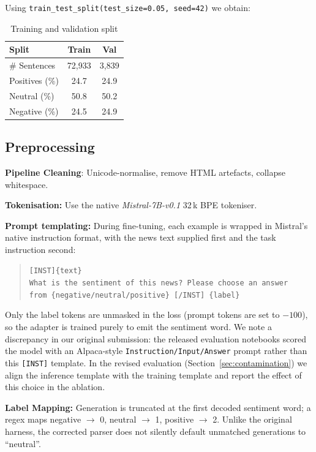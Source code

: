 \documentclass[a4paper]{article}
\begin{document}
Using \texttt{train\_test\_split(test\_size=0.05, seed=42)} we obtain:

\begin{table}[htbp]
\centering
\caption{Training and validation split}
\label{tab:train-test-split}
\begin{tabular}{lcc}
\toprule
\textbf{Split} & \textbf{Train} & \textbf{Val} \\
\midrule
\# Sentences     & 72,933 & 3,839 \\
Positives (\%)   & 24.7   & 24.9  \\
Neutral (\%)     & 50.8   & 50.2  \\
Negative (\%)    & 24.5   & 24.9  \\
\bottomrule
\end{tabular}
\end{table}

\subsection{Preprocessing}

\textbf{Pipeline Cleaning}: Unicode-normalise, remove HTML artefacts, collapse whitespace.

\textbf{Tokenisation:} Use the native \textit{Mistral-7B-v0.1} 32\,k BPE tokeniser.

\textbf{Prompt templating:} During fine-tuning, each example is wrapped in Mistral's native instruction format, with the news text supplied first and the task instruction second:

\begin{quote}
\texttt{[INST]\{text\}}\\
\texttt{What is the sentiment of this news? Please choose an answer}\\
\texttt{from \{negative/neutral/positive\} [/INST] \{label\}}
\end{quote}

Only the label tokens are unmasked in the loss (prompt tokens are set to $-100$), so the adapter is trained purely to emit the sentiment word. We note a discrepancy in our original submission: the released evaluation notebooks scored the model with an Alpaca-style \texttt{Instruction/Input/Answer} prompt rather than this \texttt{[INST]} template. In the revised evaluation (Section~\ref{sec:contamination}) we align the inference template with the training template and report the effect of this choice in the ablation.

\textbf{Label Mapping:} Generation is truncated at the first decoded sentiment word; a regex maps negative $\rightarrow$ 0, neutral $\rightarrow$ 1, positive $\rightarrow$ 2. Unlike the original harness, the corrected parser does not silently default unmatched generations to ``neutral''.
\end{document}
